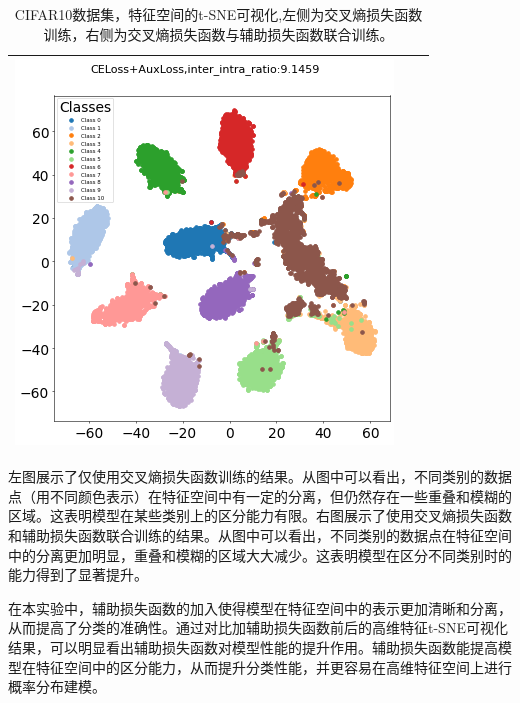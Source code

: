 \begin{table}[H]
\begin{tabular}{|c|c|c|}
\begin{minipage}{0.45\textwidth} \centering \includegraphics[width=\textwidth]{assets/vit_tsne_feature_c.png} \end{minipage} \\ \hline
\end{tabular}
\caption{CIFAR10数据集，特征空间的t-SNE可视化,左侧为交叉熵损失函数训练，右侧为交叉熵损失函数与辅助损失函数联合训练。}
\label{cifar10-tsne}
\end{table}


左图展示了仅使用交叉熵损失函数训练的结果。从图中可以看出，不同类别的数据点（用不同颜色表示）在特征空间中有一定的分离，但仍然存在一些重叠和模糊的区域。这表明模型在某些类别上的区分能力有限。右图展示了使用交叉熵损失函数和辅助损失函数联合训练的结果。从图中可以看出，不同类别的数据点在特征空间中的分离更加明显，重叠和模糊的区域大大减少。这表明模型在区分不同类别时的能力得到了显著提升。



在本实验中，辅助损失函数的加入使得模型在特征空间中的表示更加清晰和分离，从而提高了分类的准确性。通过对比加辅助损失函数前后的高维特征t-SNE可视化结果，可以明显看出辅助损失函数对模型性能的提升作用。辅助损失函数能提高模型在特征空间中的区分能力，从而提升分类性能，并更容易在高维特征空间上进行概率分布建模。


